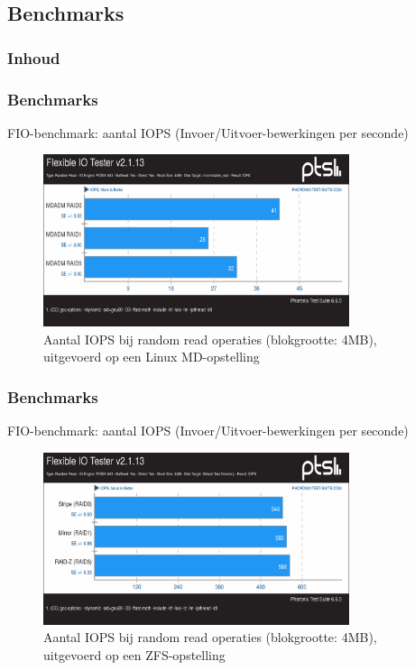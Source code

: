 \documentclass{beamer}
\begin{document}

\subsection{Benchmarks}


\begin{frame}
  \frametitle{Inhoud}
  \tableofcontents
\end{frame}



\begin{frame}
  \frametitle{Benchmarks}
  FIO-benchmark: aantal IOPS (Invoer/Uitvoer-bewerkingen per seconde)    
  \begin{figure}
    \centering
    \includegraphics[width=0.8\textwidth]{img/Testen/FIO-4MB/fio-randomread-4mb-md}
    \caption{Aantal IOPS bij random read operaties (blokgrootte: 4MB), uitgevoerd op een Linux MD-opstelling}
  \end{figure}
\end{frame}


\begin{frame}
  \frametitle{Benchmarks}
  FIO-benchmark: aantal IOPS (Invoer/Uitvoer-bewerkingen per seconde)    
  \begin{figure}
    \centering
    \includegraphics[width=0.8\textwidth]{img/Testen/FIO-4MB/fio-randomread-4mb-zfs}
    \caption{Aantal IOPS bij random read operaties (blokgrootte: 4MB), uitgevoerd op een ZFS-opstelling}
  \end{figure}
\end{frame}
\end{document}
